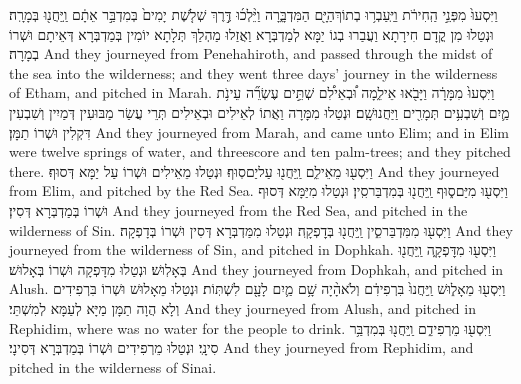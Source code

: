 {וַיִּסְעוּ֙ מִפְּנֵ֣י הַֽחִירֹ֔ת וַיַּֽעַבְר֥וּ בְתוֹךְ\maqqaf הַיָּ֖ם הַמִּדְבָּ֑רָה וַיֵּ֨לְכ֜וּ דֶּ֣רֶךְ שְׁלֹ֤שֶׁת יָמִים֙ בְּמִדְבַּ֣ר אֵתָ֔ם וַֽיַּחֲנ֖וּ בְּמָרָֽה׃}
{וּנְטַלוּ מִן קֳדָם חִירָתָא וַעֲבַרוּ בְגוֹ יַמָּא לְמַדְבְּרָא וַאֲזַלוּ מַהְלַךְ תְּלָתָא יוֹמִין ‏‏בְּמַדְבְּרָא דְּאֵיתָם וּשְׁרוֹ בְמָרָה׃}
{And they journeyed from Penehahiroth, and passed through the midst of the sea into the wilderness; and they went three days’ journey in the wilderness of Etham, and pitched in Marah.}{}
{וַיִּסְעוּ֙ מִמָּרָ֔ה וַיָּבֹ֖אוּ אֵילִ֑מָה וּ֠בְאֵילִ֠ם שְׁתֵּ֣ים עֶשְׂרֵ֞ה עֵינֹ֥ת מַ֛יִם וְשִׁבְעִ֥ים תְּמָרִ֖ים וַיַּחֲנוּ\maqqaf שָֽׁם׃}
{וּנְטַלוּ מִמָּרָה וַאֲתוֹ לְאֵילִים וּבְאֵילִים תְּרֵי עֲשַׂר מַבּוּעִין דְּמַיִין וְשִׁבְעִין דִּקְלִין וּשְׁרוֹ תַמָּן׃}
{And they journeyed from Marah, and came unto Elim; and in Elim were twelve springs of water, and threescore and ten palm-trees; and they pitched there.}{}
{וַיִּסְע֖וּ מֵאֵילִ֑ם וַֽיַּחֲנ֖וּ עַל\maqqaf יַם\maqqaf סֽוּף׃}
{וּנְטַלוּ מֵאֵילִים וּשְׁרוֹ עַל יַמָּא דְּסוּף׃}
{And they journeyed from Elim, and pitched by the Red Sea.}{}
{וַיִּסְע֖וּ מִיַּם\maqqaf ס֑וּף וַֽיַּחֲנ֖וּ בְּמִדְבַּר\maqqaf סִֽין׃}
{וּנְטַלוּ מִיַּמָּא דְּסוּף וּשְׁרוֹ בְּמַדְבְּרָא דְּסִין׃}
{And they journeyed from the Red Sea, and pitched in the wilderness of Sin.}{}
{וַיִּסְע֖וּ מִמִּדְבַּר\maqqaf סִ֑ין וַֽיַּחֲנ֖וּ בְּדׇפְקָֽה׃}
{וּנְטַלוּ מִמַּדְבְּרָא דְּסִין וּשְׁרוֹ בְּדָפְקָה׃}
{And they journeyed from the wilderness of Sin, and pitched in Dophkah.}{}
{וַיִּסְע֖וּ מִדׇּפְקָ֑ה וַֽיַּחֲנ֖וּ בְּאָלֽוּשׁ׃}
{וּנְטַלוּ מִדָּפְקָה וּשְׁרוֹ בְּאָלוּשׁ׃}
{And they journeyed from Dophkah, and pitched in Alush.}{}
{וַיִּסְע֖וּ מֵאָל֑וּשׁ וַֽיַּחֲנוּ֙ בִּרְפִידִ֔ם וְלֹא\maqqaf הָ֨יָה שָׁ֥ם מַ֛יִם לָעָ֖ם לִשְׁתּֽוֹת׃}
{וּנְטַלוּ מֵאָלוּשׁ וּשְׁרוֹ בִּרְפִידִים וְלָא הֲוָה תַמָּן מַיָּא לְעַמָּא לְמִשְׁתֵּי׃}
{And they journeyed from Alush, and pitched in Rephidim, where was no water for the people to drink.}{}
{וַיִּסְע֖וּ מֵרְפִידִ֑ם וַֽיַּחֲנ֖וּ בְּמִדְבַּ֥ר סִינָֽי׃}
{וּנְטַלוּ מֵרְפִידִים וּשְׁרוֹ בְּמַדְבְּרָא דְּסִינָי׃}
{And they journeyed from Rephidim, and pitched in the wilderness of Sinai.}{}
